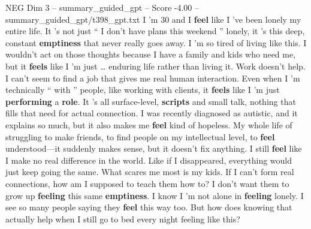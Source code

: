 \begin{textsample}{NEG Dim 3 – summary\_guided\_gpt – Score -4.00 – summary\_guided\_gpt/t398\_gpt.txt}  \label{ex:f3_neg_023}
I ’m 30 and I \textbf{feel} like I ’ve been lonely my entire life.
It ’s not just “ I don't have plans this weekend ” lonely, it ’s this deep, constant \textbf{emptiness} that never really goes away.
I ’m so tired of living like this.
I wouldn't act on those thoughts because I have a family and kids who need me, but it \textbf{feels} like I ’m just … enduring life rather than living it.
Work doesn't help.
I can't seem to find a job that gives me real human interaction.
Even when I ’m technically “ with ” people, like working with clients, it \textbf{feels} like I ’m just \textbf{performing} a \textbf{role}.
It ’s all surface-level, \textbf{scripts} and small talk, nothing that fills that need for actual connection.
I was recently diagnosed as autistic, and it explains so much, but it also makes me \textbf{feel} kind of hopeless.
My whole life of struggling to make friends, to find people on my intellectual level, to \textbf{feel} understood—it suddenly makes sense, but it doesn't fix anything.
I still \textbf{feel} like I make no real difference in the world.
Like if I disappeared, everything would just keep going the same.
What scares me most is my kids.
If I can't form real connections, how am I supposed to teach them how to?
I don't want them to grow up \textbf{feeling} this same \textbf{emptiness}.
I know I ’m not alone in \textbf{feeling} lonely.
I see so many people saying they \textbf{feel} this way too.
But how does knowing that actually help when I still go to bed every night feeling like this?

\end{textsample}
